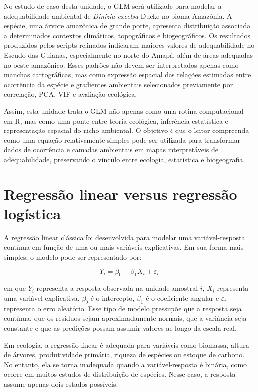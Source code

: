 No estudo de caso desta unidade, o GLM será utilizado para modelar a adequabilidade ambiental de \textit{Dinizia excelsa} Ducke no bioma Amazônia. A espécie, uma árvore amazônica de grande porte, apresenta distribuição associada a determinados contextos climáticos, topográficos e biogeográficos. Os resultados produzidos pelos scripts refinados indicaram maiores valores de adequabilidade no Escudo das Guianas, especialmente no norte do Amapá, além de áreas adequadas no oeste amazônico. Esses padrões não devem ser interpretados apenas como manchas cartográficas, mas como expressão espacial das relações estimadas entre ocorrência da espécie e gradientes ambientais selecionados previamente por correlação, PCA, VIF e avaliação ecológica.

Assim, esta unidade trata o GLM não apenas como uma rotina computacional em R, mas como uma ponte entre teoria ecológica, inferência estatística e representação espacial do nicho ambiental. O objetivo é que o leitor compreenda como uma equação relativamente simples pode ser utilizada para transformar dados de ocorrência e camadas ambientais em mapas interpretáveis de adequabilidade, preservando o vínculo entre ecologia, estatística e biogeografia.

\section{Regressão linear versus regressão logística}

A regressão linear clássica foi desenvolvida para modelar uma variável-resposta contínua em função de uma ou mais variáveis explicativas. Em sua forma mais simples, o modelo pode ser representado por:

\begin{equation}
	Y_i = \beta_0 + \beta_1X_i + \varepsilon_i
\end{equation}

\noindent em que $Y_i$ representa a resposta observada na unidade amostral $i$, $X_i$ representa uma variável explicativa, $\beta_0$ é o intercepto, $\beta_1$ é o coeficiente angular e $\varepsilon_i$ representa o erro aleatório. Esse tipo de modelo pressupõe que a resposta seja contínua, que os resíduos sejam aproximadamente normais, que a variância seja constante e que as predições possam assumir valores ao longo da escala real.

Em ecologia, a regressão linear é adequada para variáveis como biomassa, altura de árvores, produtividade primária, riqueza de espécies ou estoque de carbono. No entanto, ela se torna inadequada quando a variável-resposta é binária, como ocorre em muitos estudos de distribuição de espécies. Nesse caso, a resposta assume apenas dois estados possíveis:

